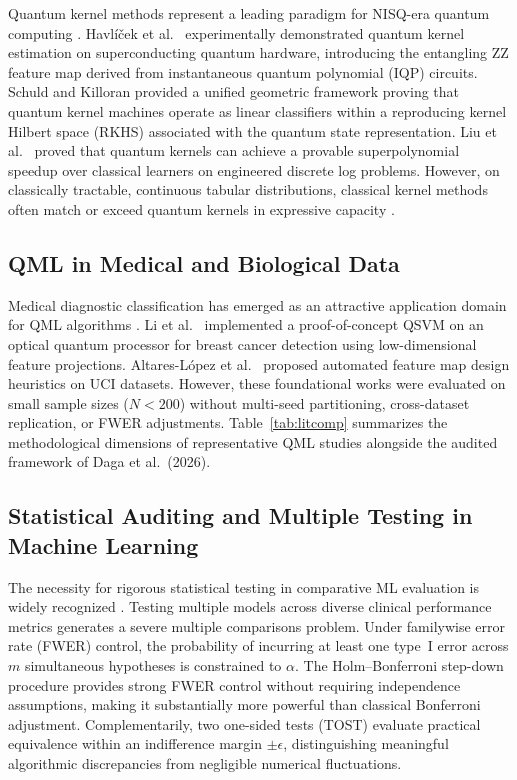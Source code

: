 \documentclass[journal,twocolumn]{IEEEtran}
\begin{document}
Quantum kernel methods represent a leading paradigm for NISQ-era quantum computing \cite{havlicek2019supervised,schuld2021supervised}. Havl{\'i}{\v c}ek et al.\ \cite{havlicek2019supervised} experimentally demonstrated quantum kernel estimation on superconducting quantum hardware, introducing the entangling ZZ feature map derived from instantaneous quantum polynomial (IQP) circuits. Schuld and Killoran \cite{schuld2021supervised} provided a unified geometric framework proving that quantum kernel machines operate as linear classifiers within a reproducing kernel Hilbert space (RKHS) associated with the quantum state representation. Liu et al.\ \cite{liu2021rigorous} proved that quantum kernels can achieve a provable superpolynomial speedup over classical learners on engineered discrete log problems. However, on classically tractable, continuous tabular distributions, classical kernel methods often match or exceed quantum kernels in expressive capacity \cite{tang2019quantum}.

\subsection{QML in Medical and Biological Data}

Medical diagnostic classification has emerged as an attractive application domain for QML algorithms \cite{li2015experimental,altares2021automatic}. Li et al.\ \cite{li2015experimental} implemented a proof-of-concept QSVM on an optical quantum processor for breast cancer detection using low-dimensional feature projections. Altares-L{\'o}pez et al.\ \cite{altares2021automatic} proposed automated feature map design heuristics on UCI datasets. However, these foundational works were evaluated on small sample sizes ($N < 200$) without multi-seed partitioning, cross-dataset replication, or FWER adjustments. Table~\ref{tab:litcomp} summarizes the methodological dimensions of representative QML studies alongside the audited framework of Daga et al.\ (2026).

\subsection{Statistical Auditing and Multiple Testing in Machine Learning}

The necessity for rigorous statistical testing in comparative ML evaluation is widely recognized \cite{demsar2006statistical,efron1994introduction}. Testing multiple models across diverse clinical performance metrics generates a severe multiple comparisons problem. Under familywise error rate (FWER) control, the probability of incurring at least one type~I error across $m$ simultaneous hypotheses is constrained to $\alpha$. The Holm--Bonferroni step-down procedure \cite{holm1979simple} provides strong FWER control without requiring independence assumptions, making it substantially more powerful than classical Bonferroni adjustment. Complementarily, two one-sided tests (TOST) \cite{wellek2010testing} evaluate practical equivalence within an indifference margin $\pm \epsilon$, distinguishing meaningful algorithmic discrepancies from negligible numerical fluctuations.
\end{document}
